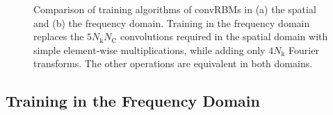 \begin{figure}[t!]
{\begin{minipage}{0.495\linewidth}
\end{minipage}
}
\caption[Comparison of training algorithms of convRBMs in the
spatial and frequency domain]{Comparison of training algorithms of convRBMs in
(a) the spatial and (b) the frequency domain. Training in the frequency domain replaces the $5N_\text{k}N_\text{C}$ convolutions required in the spatial domain with simple
element-wise multiplications, while adding only $4N_\text{k}$ Fourier
transforms. The other operations are equivalent in both domains.}
\label{fig:algorithms}
\end{figure}

\subsection[Training in the frequency domain]{Training in the Frequency Domain}

